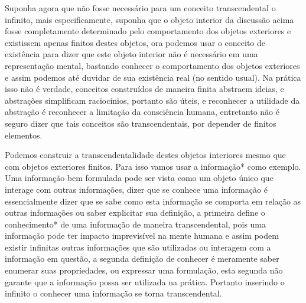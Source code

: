 \documentclass[10pt,a4paper]{report}
\begin{document}
\hspace{\baselineskip}

Suponha agora que não fosse necessário para um conceito transcendental o infinito, mais especificamente, suponha que o objeto interior da discussão acima fosse completamente determinado pelo comportamento dos objetos exteriores e existissem apenas finitos destes objetos, ora podemos usar o conceito de existência para dizer que este objeto interior não é necessário em uma representação mental, bastando conhecer o comportamento dos objetos exteriores e assim podemos até duvidar de sua existência real (no sentido usual). Na prática isso não é verdade, conceitos construídos de maneira finita abstraem ideias, e abstrações simplificam raciocínios, portanto são úteis, e reconhecer a utilidade da abstração é reconhecer a limitação da consciência humana, entretanto não é seguro dizer que tais conceitos são transcendentais, por depender de finitos elementos.

\hspace{\baselineskip}

Podemos construir a transcendentalidade destes objetos interiores mesmo que com objetos exteriores finitos. Para isso vamos usar a informação* como exemplo. Uma informação bem formulada pode ser vista como um objeto único que interage com outras informações, dizer que se conhece uma informação é essencialmente dizer que se sabe como esta informação se comporta em relação as outras informações ou saber explicitar sua definição, a primeira define o conhecimento* de uma informação de maneira transcendental, pois uma informação pode ter impacto imprevisível na mente humana e assim podem existir infinitas outras informações que são utilizadas ou interagem com a informação em questão, a segunda definição de conhecer é meramente saber enumerar suas propriedades, ou expressar uma formulação, esta segunda não garante que a informação possa ser utilizada na prática. Portanto inserindo o infinito o conhecer uma informação se torna transcendental.

\hspace{\baselineskip}
\end{document}

